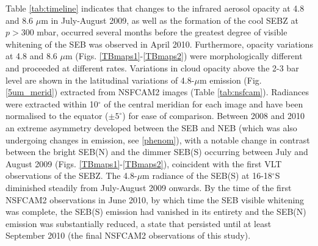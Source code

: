 \documentclass[final,5p,times,twocolumn,authoryear]{elsarticle}
\begin{document}
Table \ref{tab:timeline} indicates that changes to the infrared aerosol opacity at 4.8 and 8.6 $\mu$m in July-August 2009, as well as the formation of the cool SEBZ at $p>300$ mbar, occurred several months before the greatest degree of visible whitening of the SEB was observed in April 2010.  Furthermore, opacity variations at 4.8 and 8.6 $\mu$m (Figs. \ref{TBmaps1}-\ref{TBmaps2}) were morphologically different and proceeded at different rates.  Variations in cloud opacity above the 2-3 bar level are shown in the latitudinal variations of 4.8-$\mu$m emission (Fig. \ref{5um_merid}) extracted from NSFCAM2 images (Table \ref{tab:nsfcam}).  Radiances were extracted within 10$^\circ$ of the central meridian for each image and have been normalised to the equator ($\pm5^\circ$) for ease of comparison.   Between 2008 and 2010 an extreme asymmetry developed between the SEB and NEB (which was also undergoing changes in emission, see \ref{phenom}), with a notable change in contrast between the bright SEB(N) and the dimmer SEB(S) occurring between July and August 2009 (Figs. \ref{TBmaps1}-\ref{TBmaps2}), coincident with the first VLT observations of the SEBZ.    The 4.8-$\mu$m radiance of the SEB(S) at 16-18$^\circ$S diminished steadily from July-August 2009 onwards.  By the time of the first NSFCAM2 observations in June 2010, by which time the SEB visible whitening was complete, the SEB(S) emission had vanished in its entirety and the SEB(N) emission was substantially reduced, a state that persisted until at least September 2010 (the final NSFCAM2 observations of this study).

\begin{figure*}[tbp]
\centering
{}
\caption{Central meridian radiance scans at 4.8 $\mu$m from IRTF/NSFCAM2 (Table \ref{tab:nsfcam}) from May 2008 to September 2010.  All radiances have been normalised to the equator ($\pm5^\circ$), and then the maximum has been normalised to 1.0.  A large asymmetry between the NEB and SEB develops between 2008 and 2010.}
\label{5um_merid}
\end{figure*}
\end{document}
